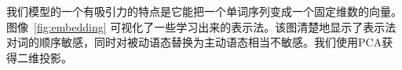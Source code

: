 
我们模型的一个有吸引力的特点是它能把一个单词序列变成一个固定维数的向量。图像~\ref{fig:embedding} 可视化了一些学习出来的表示法。该图清楚地显示了表示法对词的顺序敏感，同时对被动语态替换为主动语态相当不敏感。我们使用PCA获得二维投影。






